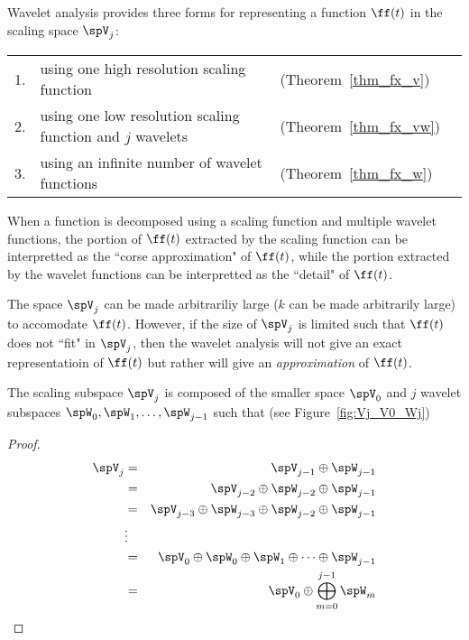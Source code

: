 Wavelet analysis provides three forms for representing a function
$\ff(t)$ in the scaling space $\spV_j$: \\
\begin{tabular}{clll}
   1. & using one high resolution scaling function\footnotemark     & (Theorem~\ref{thm_fx_v}) \\
   2. & using one low  resolution scaling function and $j$ wavelets & (Theorem~\ref{thm_fx_vw}) \\
   3. & using an infinite number of wavelet functions               & (Theorem~\ref{thm_fx_w})
\end{tabular}

When a function is decomposed using a scaling function and multiple wavelet functions,
the portion of $\ff(t)$ extracted by the scaling function can be interpretted as
the ``corse approximation" of $\ff(t)$, while
the portion extracted by the wavelet functions can be interpretted
as the ``detail" of $\ff(t)$.


The space $\spV_j$ can be made arbitrariliy large ($k$ can be made arbitrarily large)
to accomodate $\ff(t)$.
However, if the size of $\spV_j$ is limited such that $\ff(t)$ does not ``fit" in $\spV_j$,
then the wavelet analysis will not give an exact representatioin of $\ff(t)$
but rather will give an {\em approximation} of $\ff(t)$.



\begin{proposition}
\label{prop:Vk}
The scaling subspace $\spV_j$ is composed of the smaller space $\spV_0$
and $j$ wavelet subspaces $\spW_0, \spW_1, \ldots, \spW_{j-1}$ such that
(see Figure~\ref{fig:Vj_V0_Wj})
\end{proposition}
\begin{proof}
\begin{eqnarray*}
   \spV_j &=& \spV_{j-1} \oplus \spW_{j-1} \\
       &=& \spV_{j-2} \oplus \spW_{j-2} \oplus \spW_{j-1} \\
       &=& \spV_{j-3} \oplus \spW_{j-3} \oplus \spW_{j-2} \oplus \spW_{j-1} \\
       &\vdots&  \\
       &=& \spV_{0} \oplus \spW_{0} \oplus \spW_1 \oplus \cdots \oplus \spW_{j-1} \\
       &=& \spV_{0} \oplus \bigoplus\limits_{m=0}^{j-1}{\spW_{m}}
\end{eqnarray*}
\end{proof}

